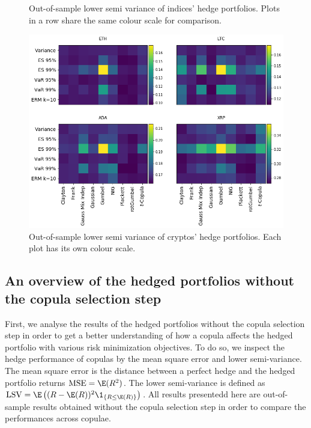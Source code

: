 \begin{landscape}
\begin{figure}[h]
\begin{minipage}[b]{0.475\linewidth}
    \caption{Out-of-sample lower semi variance of indices' hedge portfolios. Plots in a row share the same colour scale for comparison.}
  \end{minipage}
    \hfill
  \begin{minipage}[b]{0.475\linewidth}
    \centering
    \includegraphics[height=.5\linewidth]{_pics/semiVariance_cryptos.png}

    \caption{Out-of-sample lower semi variance of cryptos' hedge portfolios. Each plot has its own colour scale.}
  \end{minipage}
\end{figure}
\end{landscape}

\subsection{An overview of the hedged portfolios without the copula
  selection step}
\label{subsec:HP1}
First, we analyse the results of the hedged portfolios without the
copula selection step in order to get a better understanding of how a
copula affects the hedged portfolio with various risk minimization
objectives.
To do so, we inspect the hedge performance of copulas by
the mean square error and lower semi-variance.
The mean square error
is the distance between a perfect hedge and the hedged portfolio
returns $\operatorname{MSE}= \E(R^2)$.
The lower semi-variance is defined as
$\operatorname{LSV}=\E \left( (R-\E(R))^2 \1_{\{R\leq \E(R)\}} \right)$.
All results presentedd here are out-of-sample results obtained without
the copula selection step in order to compare the performances across
copulae.


